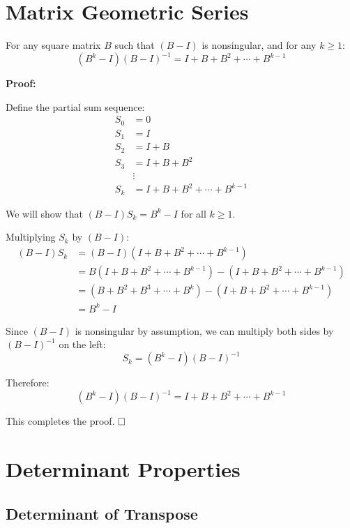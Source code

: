 \clearpage
\appendix

\section{Matrix Geometric Series}
\label{appendix:matrix-geometric-series}

\begin{tcolorbox}[colback=white,colframe=black,title=Lemma]
For any square matrix $B$ such that $(B - I)$ is nonsingular, and for any $k \geq 1$:
$$(B^k - I)(B - I)^{-1} = I + B + B^2 + \cdots + B^{k-1}$$
\end{tcolorbox}

\textbf{Proof:}

Define the partial sum sequence:
\begin{align*}
S_0 &= 0 \\
S_1 &= I \\
S_2 &= I + B \\
S_3 &= I + B + B^2 \\
&\vdots \\
S_k &= I + B + B^2 + \cdots + B^{k-1}
\end{align*}

We will show that $(B - I)S_k = B^k - I$ for all $k \geq 1$.

Multiplying $S_k$ by $(B - I)$:
\begin{align*}
(B - I)S_k &= (B - I)(I + B + B^2 + \cdots + B^{k-1}) \\
&= B(I + B + B^2 + \cdots + B^{k-1}) - (I + B + B^2 + \cdots + B^{k-1}) \\
&= (B + B^2 + B^3 + \cdots + B^k) - (I + B + B^2 + \cdots + B^{k-1}) \\
&= B^k - I
\end{align*}

Since $(B - I)$ is nonsingular by assumption, we can multiply both sides by $(B - I)^{-1}$ on the left:
$$S_k = (B^k - I)(B - I)^{-1}$$

Therefore:
$$(B^k - I)(B - I)^{-1} = I + B + B^2 + \cdots + B^{k-1}$$

This completes the proof. $\hfill \square$

\clearpage

\section{Determinant Properties}
\label{appendix:determinant-properties}

\subsection{Determinant of Transpose}
\label{appendix:det-transpose}

